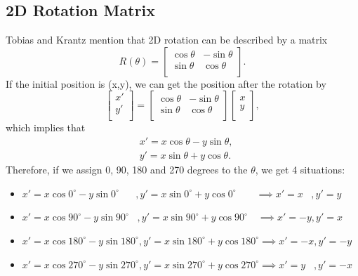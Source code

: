 \subsection{2D Rotation Matrix}
Tobias and Krantz \cite{r9} mention that 2D rotation can be described by a matrix
\begin{equation}
R(\theta)=\begin{bmatrix}
\cos\theta & -\sin\theta\\
\sin\theta & \cos\theta\\
\end{bmatrix}.
\end{equation}
If the initial position is (x,y), we can get the position after the rotation by
\begin{equation}
\begin{bmatrix}
x'\\
y'\\
\end{bmatrix}
=\begin{bmatrix}
\cos\theta & -\sin\theta\\
\sin\theta & \cos\theta\\
\end{bmatrix}
\begin{bmatrix}
x\\
y\\
\end{bmatrix},
\end{equation}
which implies that 
\begin{equation}
\begin{aligned}
&x'=x\cos\theta-y\sin\theta,\\
&y'=x\sin\theta+y\cos\theta.
\end{aligned}
\end{equation}
Therefore, if we assign 0, 90, 180 and 270 degrees to the $\theta$, we get 4 situations:
\begin{itemize}
  \item $x'=x\cos0^{\circ} - y\sin0^{\circ}\hspace{20pt},y'=x\sin0^{\circ} + y\cos0^{\circ}\hspace{24pt}\implies x'=x\hspace{10pt}, y'=y$
  \item $x'=x\cos90^{\circ} - y\sin90^{\circ}\hspace{10pt},y'=x\sin90^{\circ} + y\cos90^{\circ}\hspace{12pt}\implies x'=-y, y'=x$
  \item $x'=x\cos180^{\circ} - y\sin180^{\circ}, y'=x\sin180^{\circ} + y\cos180^{\circ} \implies x'=-x, y'=-y$
  \item $x'=x\cos270^{\circ} - y\sin270^{\circ}, y'=x\sin270^{\circ} + y\cos270^{\circ} \implies x'=y\hspace{10pt},y'=-x$
\end{itemize}
